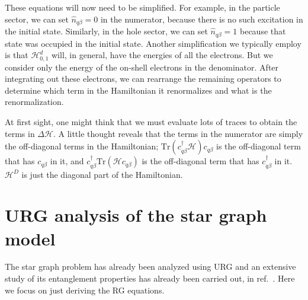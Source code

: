 These equations will now need to be simplified. For example, in the particle sector, we can set \(\hat n_{q\beta}=0\) in the numerator, because there is no such excitation in the initial state. Similarly, in  the hole sector, we can set \(\hat n_{q\beta}=1\) because that state was occupied in the initial state. Another simplification we typically employ is that \(\mathcal{H}^d_{0,1}\) will, in general, have the energies of all the electrons. But we consider only the energy of the on-shell electrons in the denominator. After integrating out these electrons, we can rearrange the remaining operators to determine which term in the Hamiltonian it renormalizes and what is the renormalization.

At first sight, one might think that we must evaluate lots of traces to obtain the terms in \(\Delta \mathcal{H}\). A little thought reveals that the terms in the numerator are simply the off-diagonal terms in the Hamiltonian; \(\text{Tr}\left(c^\dagger_{q\beta}\mathcal{H} \right)c_{q\beta}\) is the off-diagonal term that has \(c_{q\beta}\) in it, and \(c_{q\beta}^\dagger \text{Tr}\left(\mathcal{H} c_{q\beta}\right)\) is the off-diagonal term that has \(c^\dagger_{q\beta}\) in it. \(\mathcal{H}^D\) is just the diagonal part of the Hamiltonian.
\section{URG analysis of the star graph model}
	The star graph problem has already been analyzed using URG and an extensive study of its entanglement properties has already been carried out, in ref.~\cite{spa_star}. Here we focus on just deriving the RG equations.

